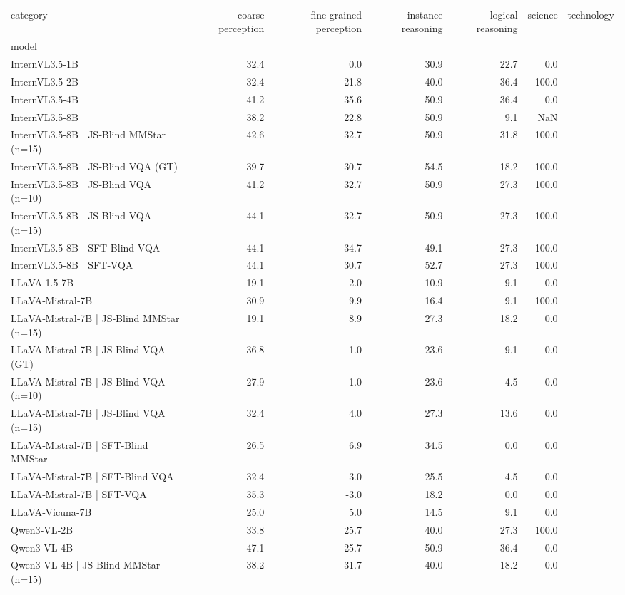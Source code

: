 \begin{tabular}{lrrrrr}
\toprule
category & coarse perception & fine-grained perception & instance reasoning & logical reasoning & science & technology \\
model &  &  &  &  &  \\
\midrule
InternVL3.5‑1B & 32.4 & 0.0 & 30.9 & 22.7 & 0.0 \\
InternVL3.5‑2B & 32.4 & 21.8 & 40.0 & 36.4 & 100.0 \\
InternVL3.5‑4B & 41.2 & 35.6 & 50.9 & 36.4 & 0.0 \\
InternVL3.5‑8B & 38.2 & 22.8 & 50.9 & 9.1 & NaN \\
InternVL3.5‑8B | JS‑Blind MMStar (n=15) & 42.6 & 32.7 & 50.9 & 31.8 & 100.0 \\
InternVL3.5‑8B | JS‑Blind VQA (GT) & 39.7 & 30.7 & 54.5 & 18.2 & 100.0 \\
InternVL3.5‑8B | JS‑Blind VQA (n=10) & 41.2 & 32.7 & 50.9 & 27.3 & 100.0 \\
InternVL3.5‑8B | JS‑Blind VQA (n=15) & 44.1 & 32.7 & 50.9 & 27.3 & 100.0 \\
InternVL3.5‑8B | SFT‑Blind VQA & 44.1 & 34.7 & 49.1 & 27.3 & 100.0 \\
InternVL3.5‑8B | SFT‑VQA & 44.1 & 30.7 & 52.7 & 27.3 & 100.0 \\
LLaVA‑1.5‑7B & 19.1 & -2.0 & 10.9 & 9.1 & 0.0 \\
LLaVA‑Mistral‑7B & 30.9 & 9.9 & 16.4 & 9.1 & 100.0 \\
LLaVA‑Mistral‑7B | JS‑Blind MMStar (n=15) & 19.1 & 8.9 & 27.3 & 18.2 & 0.0 \\
LLaVA‑Mistral‑7B | JS‑Blind VQA (GT) & 36.8 & 1.0 & 23.6 & 9.1 & 0.0 \\
LLaVA‑Mistral‑7B | JS‑Blind VQA (n=10) & 27.9 & 1.0 & 23.6 & 4.5 & 0.0 \\
LLaVA‑Mistral‑7B | JS‑Blind VQA (n=15) & 32.4 & 4.0 & 27.3 & 13.6 & 0.0 \\
LLaVA‑Mistral‑7B | SFT‑Blind MMStar & 26.5 & 6.9 & 34.5 & 0.0 & 0.0 \\
LLaVA‑Mistral‑7B | SFT‑Blind VQA & 32.4 & 3.0 & 25.5 & 4.5 & 0.0 \\
LLaVA‑Mistral‑7B | SFT‑VQA & 35.3 & -3.0 & 18.2 & 0.0 & 0.0 \\
LLaVA‑Vicuna‑7B & 25.0 & 5.0 & 14.5 & 9.1 & 0.0 \\
Qwen3‑VL‑2B & 33.8 & 25.7 & 40.0 & 27.3 & 100.0 \\
Qwen3‑VL‑4B & 47.1 & 25.7 & 50.9 & 36.4 & 0.0 \\
Qwen3‑VL‑4B | JS‑Blind MMStar (n=15) & 38.2 & 31.7 & 40.0 & 18.2 & 0.0 \\

\end{tabular}
